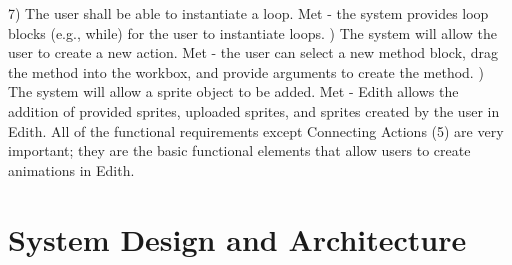 \documentclass[a4paper]{article}
\begin{document}
7) The user shall be able to instantiate a loop.  Met - the system provides loop blocks (e.g., while) for the user to instantiate loops.  \newline {}) The system will allow the user to create a new action.  Met - the user can select a new method block, drag the method into the workbox, and provide arguments to create the method.  \newline {}) The system will allow a sprite object to be added.  Met - Edith allows the addition of provided sprites, uploaded sprites, and sprites created by the user in Edith.  \newline \newline
All of the functional requirements except Connecting Actions (5)  are very important; they are the basic functional elements that allow users to create animations in Edith.   



\section{System Design and Architecture}
\end{document}
